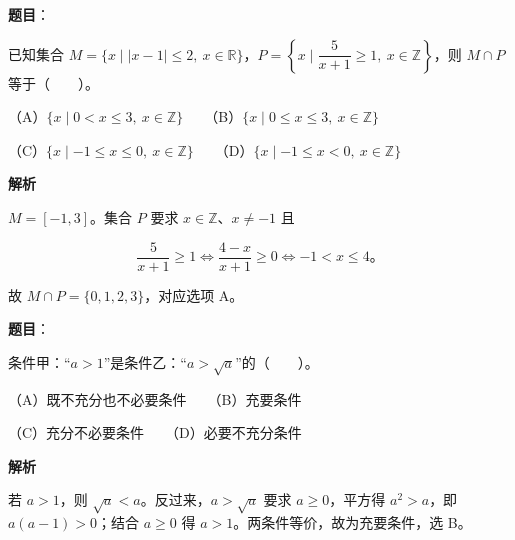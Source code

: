 \begin{answer}

\textbf{题目}：

已知集合 $M=\{x\mid |x-1|\le 2,\ x\in\mathbb R\}$，$P=\left\{x\mid \dfrac{5}{x+1}\ge 1,\ x\in\mathbb Z\right\}$，则 $M\cap P$ 等于\mbox{（　　）}。

（A）$\{x\mid 0<x\le 3,\ x\in\mathbb Z\}$　　（B）$\{x\mid 0\le x\le 3,\ x\in\mathbb Z\}$

（C）$\{x\mid -1\le x\le 0,\ x\in\mathbb Z\}$　　（D）$\{x\mid -1\le x<0,\ x\in\mathbb Z\}$

\textbf{解析}

$M=[-1,3]$。集合 $P$ 要求 $x\in\mathbb Z$、$x\ne-1$ 且

\nopagebreak[4]
\[
\frac{5}{x+1}\ge1
\iff \frac{4-x}{x+1}\ge0
\iff -1<x\le4\mbox{。}
\]

故 $M\cap P=\{0,1,2,3\}$，对应选项 A。


\end{answer}
\begin{answer}

\textbf{题目}：

条件甲：“$a>1$”是条件乙：“$a>\sqrt a$”的\mbox{（　　）}。

（A）既不充分也不必要条件　　（B）充要条件

（C）充分不必要条件　　（D）必要不充分条件

\textbf{解析}

若 $a>1$，则 $\sqrt a<a$。反过来，$a>\sqrt a$ 要求 $a\ge0$，平方得 $a^2>a$，即 $a(a-1)>0$；结合 $a\ge0$ 得 $a>1$。两条件等价，故为充要条件，选 B。


\end{answer}
